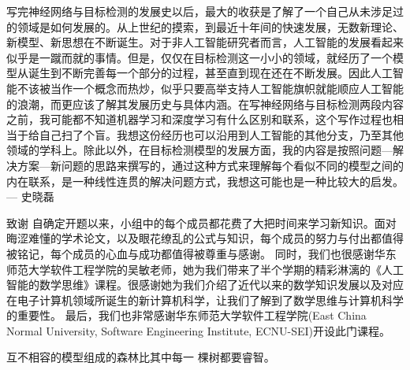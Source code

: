 写完神经网络与目标检测的发展史以后，最大的收获是了解了一个自己从未涉足过的领域是如何发展的。从上世纪的摸索，到最近十年间的快速发展，无数新理论、新模型、新思想在不断诞生。对于非人工智能研究者而言，人工智能的发展看起来似乎是一蹴而就的事情。但是，仅仅在目标检测这一小小的领域，就经历了一个模型从诞生到不断完善每一个部分的过程，甚至直到现在还在不断发展。因此人工智能不该被当作一个概念而热炒，似乎只要高举支持人工智能旗帜就能顺应人工智能的浪潮，而更应该了解其发展历史与具体内涵。在写神经网络与目标检测两段内容之前，我可能都不知道机器学习和深度学习有什么区别和联系，这个写作过程也相当于给自己扫了个盲。我想这份经历也可以沿用到人工智能的其他分支，乃至其他领域的学科上。除此以外，在目标检测模型的发展方面，我的内容是按照问题---解决方案---新问题的思路来撰写的，通过这种方式来理解每个看似不同的模型之间的内在联系，是一种线性连贯的解决问题方式，我想这可能也是一种比较大的启发。
--- 史晓磊

致谢
自确定开题以来，小组中的每个成员都花费了大把时间来学习新知识。面对晦涩难懂的学术论文，以及眼花缭乱的公式与知识，每个成员的努力与付出都值得被铭记，每个成员的心血与成功都值得被尊重与感谢。
同时，我们也很感谢华东师范大学软件工程学院的吴敏老师，她为我们带来了半个学期的精彩淋漓的《人工智能的数学思维》课程。很感谢她为我们介绍了近代以来的数学知识发展以及对应在电子计算机领域所诞生的新计算机科学，让我们了解到了数学思维与计算机科学的重要性。
最后，我们也非常感谢华东师范大学软件工程学院(East China Normal University, Software Engineering Institute, ECNU-SEI)开设此门课程。 

互不相容的模型组成的森林比其中每一 棵树都要睿智。

